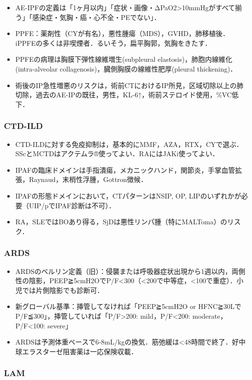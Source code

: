 \begin{itemize}
\item AE-IPFの定義は「1ヶ月以内」「症状・画像・ΔPaO2>10mmHgがすべて揃う」「感染症・気胸・癌・心不全・PEでない」．
\item PPFE：薬剤性（CYが有名），悪性腫瘍（MDS），GVHD，肺移植後．iPPFEの多くは非喫煙者．るいそう，扁平胸郭，気胸をきたす．
\item PPFEの病理は胸膜下弾性線維増生(subpleural elastosis)，肺胞内線維化(intra-alveolar collagenosis)，臓側胸膜の線維性肥厚(pleural thickening)．
\item 術後のIP急性増悪のリスクは，術前CTにおけるIP所見，区域切除以上の肺切除，過去のAE-IPの既往，男性，KL-6↑，術前ステロイド使用，\%VC低下．
\end{itemize}


\subsubsection{CTD-ILD}
\begin{itemize}
\item CTD-ILDに対する免疫抑制は，基本的にMMF，AZA，RTX，CYで選ぶ．SScとMCTDはアクテムラ®使ってよい．RAにはJAKi使ってよい．
\item IPAFの臨床ドメインは手指潰瘍，メカニックハンド，関節炎，手掌血管拡張，Raynaud，末梢性浮腫，Gottron徴候．
\item IPAFの形態ドメインにおいて，CTパターンはNSIP, OP, LIPのいずれかが必要（UIP/pでIPAF診断は不可）．
\item RA，SLEではBOあり得る，SjDは悪性リンパ腫（特にMALToma）のリスク．
\end{itemize}


\subsubsection{ARDS}
\begin{itemize}
\item ARDSのベルリン定義（旧）：侵襲または呼吸器症状出現から1週以内，両側性の陰影，PEEP≧5cmH2OでP/F<300（<200で中等症，<100で重症）．小児では片側陰影でも診断可．
\item 新グローバル基準：挿管してなければ「PEEP≧5cmH2O or HFNC≧30LでP/F≦300」，挿管していれば「P/F>200: mild，P/F<200: moderate，P/F<100: severe」
\item ARDSは予測体重ベースで6-8mL/kgの換気．筋弛緩は<48時間で終了．好中球エラスターゼ阻害薬は一応保険収載．
\end{itemize}


\subsubsection{LAM}

